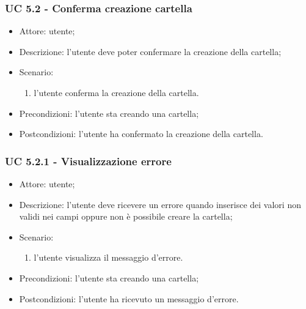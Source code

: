     \subsubsection{UC 5.2 - Conferma creazione cartella} \label{sec: UC 5.2}
    \begin{itemize}
        \item Attore: utente;
        \item Descrizione: l'utente deve poter confermare la creazione della cartella;
        \item Scenario:
        \begin{enumerate}
        \item l'utente conferma la creazione della cartella.
        \end{enumerate}
        \item Precondizioni: l'utente sta creando una cartella;
        \item Postcondizioni: l'utente ha confermato la creazione della cartella.
    \end{itemize}

    \subsubsection{UC 5.2.1 - Visualizzazione errore } \label{sec: UC 5.2.1}
    \begin{itemize}
        \item Attore: utente;
        \item Descrizione: l'utente deve ricevere un errore quando inserisce dei valori non validi nei campi oppure non è possibile creare la cartella;
        \item Scenario:
        \begin{enumerate}
        \item l'utente visualizza il messaggio d'errore.
        \end{enumerate}   
        \item Precondizioni: l'utente sta creando una cartella;
        \item Postcondizioni: l'utente ha ricevuto un messaggio d'errore.
    \end{itemize}


